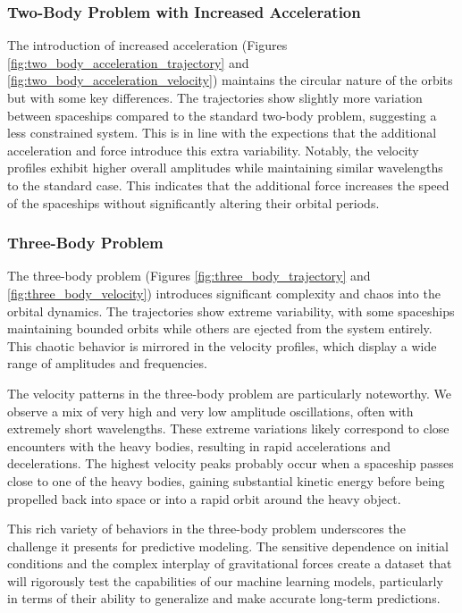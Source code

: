 \documentclass[11pt,a4paper, twocolumn]{article}
\begin{document}
\subsubsection{Two-Body Problem with Increased Acceleration}
The introduction of increased acceleration (Figures \ref{fig:two_body_acceleration_trajectory} and \ref{fig:two_body_acceleration_velocity}) maintains the circular nature of the orbits but with some key differences. The trajectories show slightly more variation between spaceships compared to the standard two-body problem, suggesting a less constrained system. This is in line with the expections that the additional acceleration and force introduce this extra variability. Notably, the velocity profiles exhibit higher overall amplitudes while maintaining similar wavelengths to the standard case. This indicates that the additional force increases the speed of the spaceships without significantly altering their orbital periods.

\subsubsection{Three-Body Problem}
The three-body problem (Figures \ref{fig:three_body_trajectory} and \ref{fig:three_body_velocity}) introduces significant complexity and chaos into the orbital dynamics. The trajectories show extreme variability, with some spaceships maintaining bounded orbits while others are ejected from the system entirely. This chaotic behavior is mirrored in the velocity profiles, which display a wide range of amplitudes and frequencies.

The velocity patterns in the three-body problem are particularly noteworthy. We observe a mix of very high and very low amplitude oscillations, often with extremely short wavelengths. These extreme variations likely correspond to close encounters with the heavy bodies, resulting in rapid accelerations and decelerations. The highest velocity peaks probably occur when a spaceship passes close to one of the heavy bodies, gaining substantial kinetic energy before being propelled back into space or into a rapid orbit around the heavy object.

This rich variety of behaviors in the three-body problem underscores the challenge it presents for predictive modeling. The sensitive dependence on initial conditions and the complex interplay of gravitational forces create a dataset that will rigorously test the capabilities of our machine learning models, particularly in terms of their ability to generalize and make accurate long-term predictions.
\end{document}
